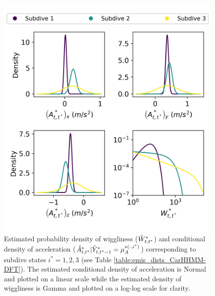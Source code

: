 \begin{figure}[ht]
	\centering
	\includegraphics[width=5in]{../Plots/CarHHMM2-fine-emissions.png}
	\caption{Estimated probability density of wiggliness ($\tilde{W}^*_{t,t^*}$) and conditional density of acceleration ($\tilde{A}^*_{t,t^*}|\tilde{Y}^*_{t,t^*-1} = \mu_A^{*(\cdot,i^*)}$) corresponding to subdive states $i^* = 1,2,3$ (see Table \ref{table:emis_dists_CarHHMM-DFT}). The estimated conditional density of acceleration is Normal and plotted on a linear scale while the estimated density of wiggliness is Gamma and plotted on a log-log scale for clarity.}
	\label{fig:fine_emis}
\end{figure}

